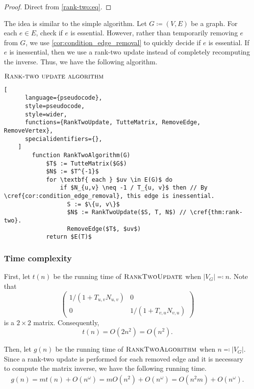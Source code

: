 \begin{proof}
    Direct from \cref{rank-two:eq}. 
\end{proof}

The idea is similar to the simple algorithm.
Let \(G \coloneqq (V, E)\) be a graph.
For each \(e \in E\), check if \(e\) is essential.
However, rather than temporarily removing \(e\) from \(G\), we use \cref{cor:condition_edge_removal} to quickly decide if \(e\) is essential.
If \(e\) is inessential, then we use a rank-two update instead of completely recomputing the inverse.
Thus, we have the following algorithm.

\begin{programruledcaption}{\(\textsc{Rank-two update algorithm}\)}
  \label{alg:rank-two}
    \begin{lstlisting}[
      language={pseudocode},
      style=pseudocode,
      style=wider,
      functions={RankTwoUpdate, TutteMatrix, RemoveEdge, RemoveVertex},
      specialidentifiers={},
    ]
        function RankTwoAlgorithm(G)
            $T$ := TutteMatrix($G$)
            $N$ := $T^{-1}$
            for \textbf{ each } $uv \in E(G)$ do
                if $N_{u,v} \neq -1 / T_{u, v}$ then // By \cref{cor:condition_edge_removal}, this edge is inessential.
                  S := $\{u, v\}$
                  $N$ := RankTwoUpdate($S, T, N$) // \cref{thm:rank-two}.
                  RemoveEdge($T$, $uv$)
            return $E(T)$
    \end{lstlisting}
\end{programruledcaption}

\subsubsection{Time complexity}
\noindent
First, let \(t(n)\) be the running time of \(\textsc{RankTwoUpdate}\) when \(|V_G| \eqcolon n\).
Note that 
\[
  \begin{pmatrix} 1 / (1 + T_{u, v}N_{u, v}) & 0  \\ 0 & 1 / (1 + T_{v, u}N_{v, u}) \end{pmatrix}
\]
is a \(2 \times 2\) matrix. 
Consequently,
\[
    t(n) = O(2n^2) = O(n^2).
\]

Then, let \(g(n)\) be the running time of \(\textsc{RankTwoAlgorithm}\) when \(n \eqcolon |V_G|\).
Since a rank-two update is performed for each removed edge and it is necessary to compute the matrix inverse,
we have the following running time.
\begin{align*}
    g(n) = m t(n) + O(n^\omega) = m O(n^2) + O(n^\omega) = O(n^2m) + O(n^\omega).
\end{align*}
